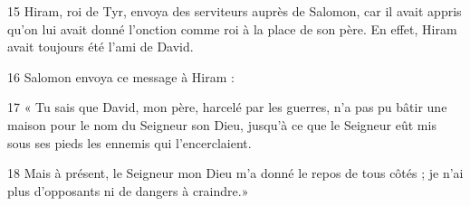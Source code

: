 
15 Hiram, roi de Tyr, envoya des serviteurs auprès de Salomon, car il avait appris qu’on lui avait donné l’onction comme roi à la place de son père. En effet, Hiram avait toujours été l’ami de David.

16 Salomon envoya ce message à Hiram :

17 « Tu sais que David, mon père, harcelé par les guerres, n’a pas pu bâtir une maison pour le nom du Seigneur son Dieu, jusqu’à ce que le Seigneur eût mis sous ses pieds les ennemis qui l’encerclaient.

18 Mais à présent, le Seigneur mon Dieu m’a donné le repos de tous côtés ; je n’ai plus d’opposants ni de dangers à craindre.»
